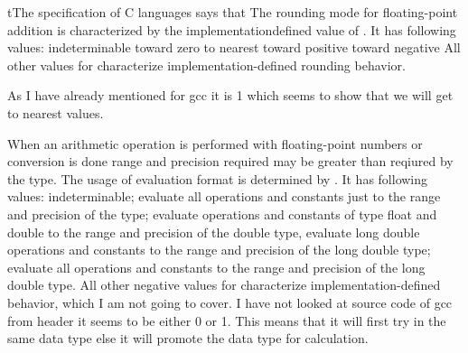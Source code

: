 tThe specification of C languages says that The rounding mode for
floating-point addition is characterized by the implementationdefined
value of . It has following values:\hfill\break
{} indeterminable\hfill\break
{} toward zero\hfill\break
{} to nearest\hfill\break
{} toward positive \infty\hfill\break
{} toward negative \infty\hfill\break
All other values for  characterize implementation-defined rounding
behavior. 

As I have already mentioned for gcc it is 1 which seems to show that
we will get to nearest values.

When an arithmetic operation is performed with floating-point numbers
or conversion is done range and precision required may be greater than
reqiured by the type. The usage of evaluation format is determined by
. It has following values:\hfill\break
{} indeterminable;\hfill\break
{} evaluate all operations and constants just to the range and
precision of the type;\hfill\break
{} evaluate operations and constants of type float and double to the
range and precision of the double type, evaluate long double
operations and constants to the range and precision of the long double
type;\hfill\break
{} evaluate all operations and constants to the range and precision of the
long double type.\hfill\break
All other negative values for  characterize
implementation-defined behavior, which I am not going to cover. I have
not looked at source code of gcc from header it seems to be either 0
or 1. This means that it will first try in the same data type else it
will promote the data type for calculation.

